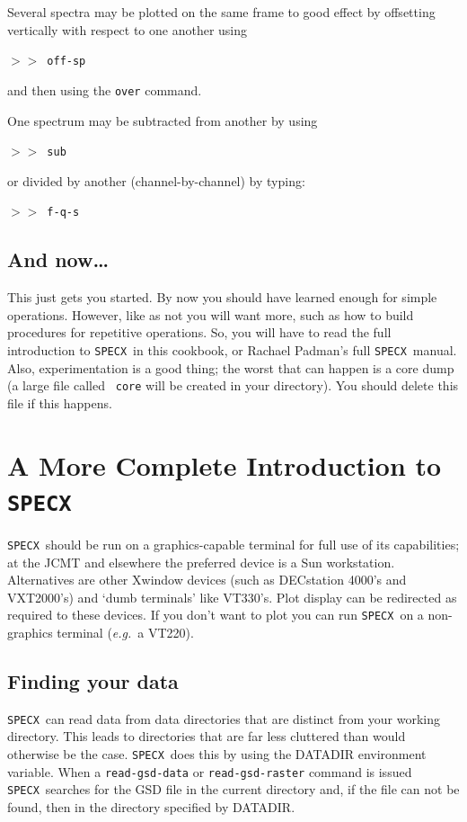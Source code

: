\documentclass[11pt,twoside]{article}
\newcommand{\xlabel}[1]{}
\newcommand{\eg}{{\it e.g.}}
\newcommand{\SPECX}{{\tt SPECX}}
\newcommand{\SP}{{$>\!>$}}
\begin{document}
Several spectra may be plotted on the same frame to good effect by
offsetting vertically with respect to one another using

\SP\ {\tt off-sp}

and then using the {\tt over} command.

One spectrum may be subtracted from another by using

\SP\ {\tt sub}

or divided by another (channel-by-channel) by typing:

\SP\ {\tt f-q-s}

\subsection{And now\ldots}
This just gets you started. By now you should have learned enough for
simple operations. However, like as not you will want more, such as how
to build procedures for repetitive operations. So, you will have to
read the full introduction to \SPECX\ in this cookbook, or Rachael
Padman's full \SPECX\ manual. Also, experimentation is a good thing;
the worst that can happen is a core dump (a large file called {\tt
core} will be created in your directory). You should delete this file
if this happens.


\section{\xlabel{a_more_complex_introdcution_to_specx}%
A More Complete Introduction to \SPECX }
\label{sec:specx-intro}

\SPECX\ should be run on a graphics-capable terminal for full use of its
capabilities; at the JCMT and elsewhere the preferred device is a Sun
workstation. Alternatives are other Xwindow devices (such as DECstation
4000's and VXT2000's) and `dumb terminals' like VT330's. Plot display
can be redirected as required to these devices. If you don't want to
plot you can run \SPECX\ on a non-graphics terminal (\eg\ a VT220).


\subsection{Finding your data}
\label{sec:finding-the-data}

\SPECX\ can read data from data directories that are distinct from your
working directory. This leads to directories that are far less cluttered than
would otherwise be the case. \SPECX\ does this by using the DATADIR
environment variable. When a {\tt read-gsd-data} or {\tt read-gsd-raster}
command is issued \SPECX\ searches for the GSD file in the current directory
and, if the file can not be found, then in the directory specified by
DATADIR.
\end{document}
